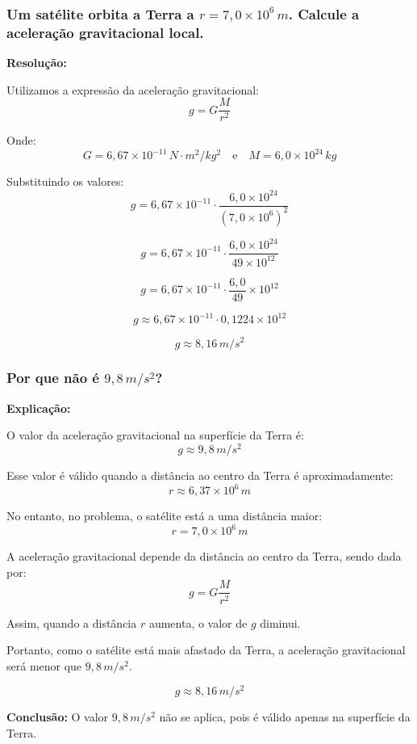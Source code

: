 \documentclass[a4paper,12pt]{article}
\begin{document}
\subsubsection{Um satélite orbita a Terra a $r = 7{,}0 \times 10^6\,m$. Calcule a aceleração gravitacional local.}
{\color{blue}
\textbf{Resolução:}

Utilizamos a expressão da aceleração gravitacional:
\[
g = G \frac{M}{r^2}
\]

Onde:
\[
G = 6{,}67 \times 10^{-11}\,N \cdot m^2/kg^2 \quad \text{e} \quad M = 6{,}0 \times 10^{24}\,kg
\]

Substituindo os valores:
\[
g = 6{,}67 \times 10^{-11} \cdot \frac{6{,}0 \times 10^{24}}{(7{,}0 \times 10^6)^2}
\]

\[
g = 6{,}67 \times 10^{-11} \cdot \frac{6{,}0 \times 10^{24}}{49 \times 10^{12}}
\]

\[
g = 6{,}67 \times 10^{-11} \cdot \frac{6{,}0}{49} \times 10^{12}
\]

\[
g \approx 6{,}67 \times 10^{-11} \cdot 0{,}1224 \times 10^{12}
\]

\[
g \approx 8{,}16\,m/s^2
\]

}

\subsubsection*{Por que não é $9{,}8\,m/s^2$?}

{\color{blue}
\textbf{Explicação:}

O valor da aceleração gravitacional na superfície da Terra é:
\[
g \approx 9{,}8\,m/s^2
\]

Esse valor é válido quando a distância ao centro da Terra é aproximadamente:
\[
r \approx 6{,}37 \times 10^6\,m
\]

No entanto, no problema, o satélite está a uma distância maior:
\[
r = 7{,}0 \times 10^6\,m
\]

A aceleração gravitacional depende da distância ao centro da Terra, sendo dada por:
\[
g = G \frac{M}{r^2}
\]

Assim, quando a distância $r$ aumenta, o valor de $g$ diminui.

Portanto, como o satélite está mais afastado da Terra, a aceleração gravitacional será menor que $9{,}8\,m/s^2$.

\[
g \approx 8{,}16\,m/s^2
\]

\textbf{Conclusão:} O valor $9{,}8\,m/s^2$ não se aplica, pois é válido apenas na superfície da Terra.
}
\end{document}
